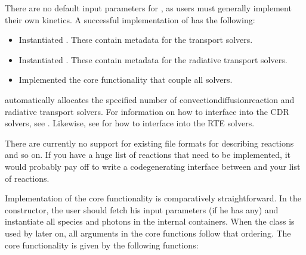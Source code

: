 \documentclass[letterpaper,10pt,english]{sphinxmanual}
\begin{document}
There are no default input parameters for {\hyperref[\detokenize{MinimalPlasmaModel:chap-cdr-plasma-physics}]{}}, as users must generally implement their own kinetics.
A successful implementation of {\hyperref[\detokenize{MinimalPlasmaModel:chap-cdr-plasma-physics}]{}} has the following:
\begin{itemize}
\item {} 
Instantiated {\hyperref[\detokenize{MinimalPlasmaModel:chap-species}]{}}. These contain metadata for the transport solvers.

\item {} 
Instantiated {\hyperref[\detokenize{MinimalPlasmaModel:chap-photon}]{}}. These contain metadata for the radiative transport solvers.

\item {} 
Implemented the core functionality that couple all solvers.

\end{itemize}

 automatically allocates the specified number of convection\sphinxhyphen{}diffusion\sphinxhyphen{}reaction and radiative transport solvers. For information on how to interface into the CDR solvers, see {\hyperref[\detokenize{MinimalPlasmaModel:chap-species}]{}}. Likewise, see {\hyperref[\detokenize{MinimalPlasmaModel:chap-photon}]{}} for how to interface into the RTE solvers.

There are currently no support for existing file formats for describing reactions and so on. If you have a huge list of reactions that need to be implemented, it would probably pay off to write a code\sphinxhyphen{}generating interface between {\hyperref[\detokenize{MinimalPlasmaModel:chap-cdr-plasma-physics}]{}} and your list of reactions.

Implementation of the core functionality is comparatively straightforward. In the constructor, the user should fetch his input parameters (if he has any) and  instantiate all species and photons in the internal containers. When the class is used by  later on, all arguments in the core functions follow that ordering. The core functionality is given by the following functions:
\end{document}
